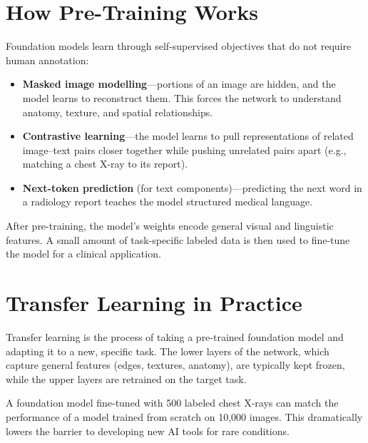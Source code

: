 \section{How Pre-Training Works}
Foundation models learn through self-supervised objectives that do not require human annotation:

\begin{itemize}
    \item \textbf{Masked image modelling}---portions of an image are hidden, and the model learns to reconstruct them. This forces the network to understand anatomy, texture, and spatial relationships.
    \item \textbf{Contrastive learning}---the model learns to pull representations of related image--text pairs closer together while pushing unrelated pairs apart (e.g., matching a chest X-ray to its report).
    \item \textbf{Next-token prediction} (for text components)---predicting the next word in a radiology report teaches the model structured medical language.
\end{itemize}

After pre-training, the model's weights encode general visual and linguistic features. A small amount of task-specific labeled data is then used to fine-tune the model for a clinical application.

\section{Transfer Learning in Practice}
Transfer learning is the process of taking a pre-trained foundation model and adapting it to a new, specific task. The lower layers of the network, which capture general features (edges, textures, anatomy), are typically kept frozen, while the upper layers are retrained on the target task.

\begin{pearlbox}
A foundation model fine-tuned with 500 labeled chest X-rays can match the performance of a model trained from scratch on 10{,}000 images. This dramatically lowers the barrier to developing new AI tools for rare conditions.
\end{pearlbox}


